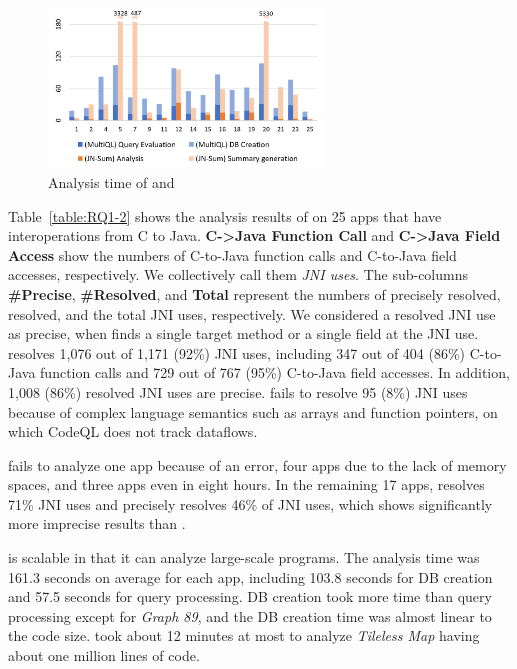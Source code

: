 

\begin{figure}
  \centering
  \vspace{2mm}
  \includegraphics[width=0.65\textwidth]{img/graph}
  \vspace*{-.5em}
  \caption{Analysis time of \ours and \lees}
  \label{fig:graph}
\vspace*{-1em}
\end{figure}

Table~\ref{table:RQ1-2} shows the analysis results of \ours on 25 apps that have
interoperations from C to Java.
{\bf C->Java Function Call} and {\bf C->Java Field Access} show the numbers of
C-to-Java function calls and C-to-Java field accesses, respectively. We
collectively call them \emph{JNI uses}.
The sub-columns {\bf \#Precise}, {\bf \#Resolved}, and {\bf Total} represent
the numbers of precisely resolved, resolved, and the total JNI uses,
respectively.
We considered a resolved JNI use as precise, when \ours finds a single target
method or a single field at the JNI use.
\ours resolves 1,076 out of 1,171 (92\%) JNI uses, including 347 out of 404
(86\%) C-to-Java function calls and 729 out of 767 (95\%) C-to-Java field
accesses. 
In addition, 1,008 (86\%) resolved JNI uses are precise.
\ours fails to resolve 95 (8\%) JNI uses because of complex language semantics
such as arrays and function pointers, on which
CodeQL does not track dataflows.

\lees fails to analyze one app because of an error, four apps due to the lack
of memory spaces, and three apps even in eight hours.  
In the remaining 17 apps, \lees resolves 71\% JNI uses
and precisely resolves 46\% of JNI uses,
which shows significantly more imprecise results than \ours.

\ours is scalable in that it can analyze large-scale programs. 
The analysis time was 161.3 seconds on average for each app, including 103.8
seconds for DB creation and 57.5 seconds for query processing.  
DB creation took more time than query processing except for {\it Graph 89}, and
the DB creation time was almost linear to the code size. 
\ours took about 12 minutes at most to analyze {\it Tileless Map} having about
one million lines of code.

